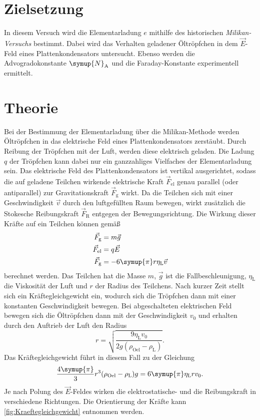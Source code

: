 \section{Zielsetzung}
\label{sec:Ziel}
In diesem Versuch wird die Elementarladung $e$ mithilfe des historischen \textit{Milikan-Versuchs} bestimmt. Dabei wird das Verhalten geladener
Öltröpfchen in dem $\vec{E}$-Feld eines Plattenkondensators untersucht. Ebenso werden die Advogradokonstante $\symup{N}_{\text{A}}$ und die Faraday-Konstante
experimentell ermittelt.

\section{Theorie}
\label{sec:Theorie}
Bei der Bestimmung der Elementarladung über die Milikan-Methode werden Öltröpfchen in das elektrische Feld eines Plattenkondensators zerstäubt.
Durch Reibung der Tröpfchen mit der Luft, werden diese elektrisch geladen. Die Ladung $q$ der Tröpfchen kann dabei nur ein ganzzahliges
Vielfaches der Elementarladung sein.
Das elektrische Feld des Plattenkondensators ist vertikal ausgerichtet, sodass die auf geladene Teilchen wirkende elektrische Kraft 
$\vec{F}_\text{el}$ genau parallel (oder antiparallel) zur Gravitationskraft $\vec{F}_\text{g}$ wirkt. Da die Teilchen sich mit einer 
Geschwindigkeit $\vec{v}$ durch den luftgefüllten Raum bewegen, wirkt zusätzlich die Stokesche Reibungskraft $\vec{F}_\text{R}$ entgegen der Bewegungsrichtung.
Die Wirkung dieser Kräfte auf ein Teilchen können gemäß
\begin{align}
    \label{eqn:Kraefte}
    \vec{F}_\text{g} &= m \vec{g} \\
    \vec{F}_\text{el} &= q \vec{E} \\
    \vec{F}_\text{g} &= -6\symup{\pi}r\eta_\text{L} \vec{v}
\end{align}
berechnet werden. Das Teilchen hat die Masse $m$, $\vec{g}$ ist die Fallbeschleunigung, $\eta_\text{L}$ die
Viskosität der Luft und $r$ der Radius des Teilchens.
Nach kurzer Zeit stellt sich ein Kräftegleichgewicht ein, wodurch sich die Tröpfchen dann mit einer konstanten Geschwindigkeit bewegen.
Bei abgeschalteten elektrischen Feld bewegen sich die Öltröpfchen dann mit der Geschwindigkeit $v_0$ und erhalten durch den Auftrieb der Luft den Radius
\begin{equation}
    \label{eqn:Radius}
    r = \sqrt{\frac{9 \eta_\text{L}v_0}{2g(\rho_\text{Oel}- \rho_\text{L})}}.
\end{equation}
Das Kräftegleichgewicht führt in diesem Fall zu der Gleichung
\begin{equation*}
    \frac{4\symup{\pi}}{3}r^3(\rho_\text{Oel}- \rho_\text{L})g = 6 \symup{\pi} \eta_\text{L}r v_0.
\end{equation*}
Je nach Polung des $\vec{E}$-Feldes wirken die elektrostatische- und die Reibungskraft in verschiedene Richtungen. 
Die Orientierung der Kräfte kann \autoref{fig:Kraeftegleichgewicht} entnommen werden.

